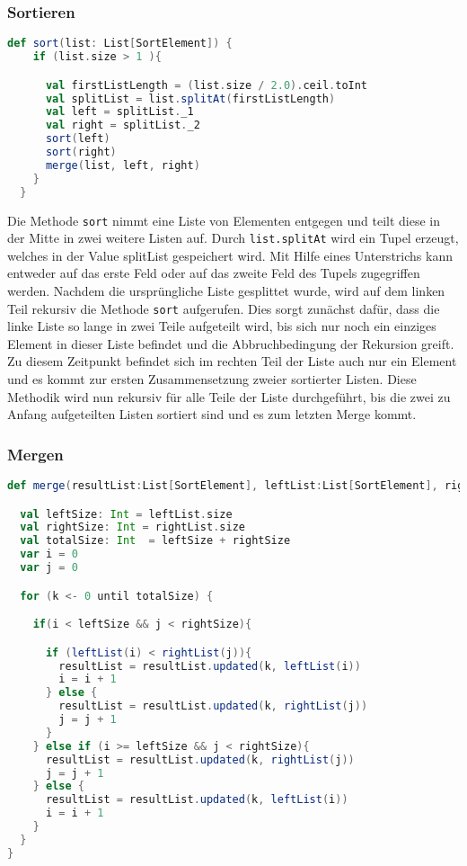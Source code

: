 \subsubsection{Sortieren}

\begin{lstlisting}[language=Scala]
def sort(list: List[SortElement]) {
    if (list.size > 1 ){

      val firstListLength = (list.size / 2.0).ceil.toInt
      val splitList = list.splitAt(firstListLength)
      val left = splitList._1
      val right = splitList._2
      sort(left)
      sort(right)
      merge(list, left, right)
    }
  }
\end{lstlisting}

Die Methode \texttt{sort} nimmt eine Liste von Elementen entgegen und teilt diese in der Mitte in zwei weitere Listen auf. Durch \texttt{list.splitAt} wird ein Tupel erzeugt, welches in der Value splitList gespeichert wird. Mit Hilfe eines Unterstrichs kann entweder auf das erste Feld oder auf das zweite Feld des Tupels zugegriffen werden. Nachdem die ursprüngliche Liste gesplittet wurde, wird auf dem linken Teil rekursiv die Methode \texttt{sort} aufgerufen. Dies sorgt zunächst dafür, dass die linke Liste so lange in zwei Teile aufgeteilt wird, bis sich nur noch ein einziges Element in dieser Liste befindet und die Abbruchbedingung der Rekursion greift. Zu diesem Zeitpunkt befindet sich im rechten Teil der Liste auch nur ein Element und es kommt zur ersten Zusammensetzung zweier sortierter Listen. Diese Methodik wird nun rekursiv für alle Teile der Liste durchgeführt, bis die zwei zu Anfang aufgeteilten Listen sortiert sind und es zum letzten Merge kommt.

\subsubsection{Mergen}
\begin{lstlisting}[language=Scala]
def merge(resultList:List[SortElement], leftList:List[SortElement], rightList:List[SortElement]) {

  val leftSize: Int = leftList.size
  val rightSize: Int = rightList.size
  val totalSize: Int  = leftSize + rightSize
  var i = 0
  var j = 0

  for (k <- 0 until totalSize) {

    if(i < leftSize && j < rightSize){

      if (leftList(i) < rightList(j)){
        resultList = resultList.updated(k, leftList(i))
        i = i + 1
      } else {
        resultList = resultList.updated(k, rightList(j))
        j = j + 1
      }
    } else if (i >= leftSize && j < rightSize){
      resultList = resultList.updated(k, rightList(j))
      j = j + 1
    } else {
      resultList = resultList.updated(k, leftList(i))
      i = i + 1
    }
  }
}
\end{lstlisting}

